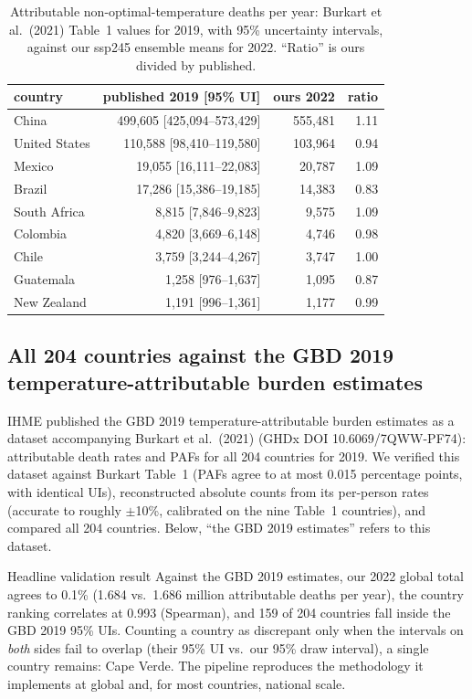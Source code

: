 \documentclass[11pt]{ozreport}
\begin{document}
\begin{table}[b]
\centering
\small
\begin{tabular}{lrrr}
\hline
country & published 2019 [95\% UI] & ours 2022 & ratio \\
\hline
China          & 499{,}605 [425{,}094--573{,}429] & 555{,}481 & 1.11 \\
United States  & 110{,}588 [98{,}410--119{,}580]  & 103{,}964 & 0.94 \\
Mexico         & 19{,}055 [16{,}111--22{,}083]    & 20{,}787  & 1.09 \\
Brazil         & 17{,}286 [15{,}386--19{,}185]    & 14{,}383  & 0.83 \\
South Africa   & 8{,}815 [7{,}846--9{,}823]       & 9{,}575   & 1.09 \\
Colombia       & 4{,}820 [3{,}669--6{,}148]       & 4{,}746   & 0.98 \\
Chile          & 3{,}759 [3{,}244--4{,}267]       & 3{,}747   & 1.00 \\
Guatemala      & 1{,}258 [976--1{,}637]           & 1{,}095   & 0.87 \\
New Zealand    & 1{,}191 [996--1{,}361]           & 1{,}177   & 0.99 \\
\hline
\end{tabular}
\caption{Attributable non-optimal-temperature deaths per year: Burkart et
al.\ (2021) Table~1 values for 2019, with 95\% uncertainty intervals, against
our ssp245 ensemble means for 2022. ``Ratio'' is ours divided by published.}
\label{tab:nine}
\end{table}

\subsection{All 204 countries against the GBD 2019 temperature-attributable
burden estimates}

IHME published the GBD 2019 temperature-attributable burden estimates as a
dataset accompanying Burkart et al.\ (2021) (GHDx DOI 10.6069/7QWW-PF74):
attributable death rates and PAFs for all 204 countries for 2019. We
verified this dataset against Burkart Table~1 (PAFs agree to at most 0.015
percentage points, with identical UIs), reconstructed absolute counts from
its per-person rates (accurate to roughly $\pm$10\%, calibrated on the nine
Table~1 countries), and compared all 204 countries. Below, ``the GBD 2019
estimates'' refers to this dataset.

\begin{ozresult}{Headline validation result}
Against the GBD 2019 estimates, our 2022 global total agrees to 0.1\%
(1.684 vs.\ 1.686 million attributable deaths per year), the country
ranking correlates at 0.993 (Spearman), and 159 of 204 countries fall
inside the GBD 2019 95\% UIs. Counting a country as discrepant only when
the intervals on \emph{both} sides fail to overlap (their 95\% UI vs.\ our
95\% draw interval), a single country remains: Cape Verde. The pipeline
reproduces the methodology it implements at global and, for most countries,
national scale.
\end{ozresult}
\end{document}
